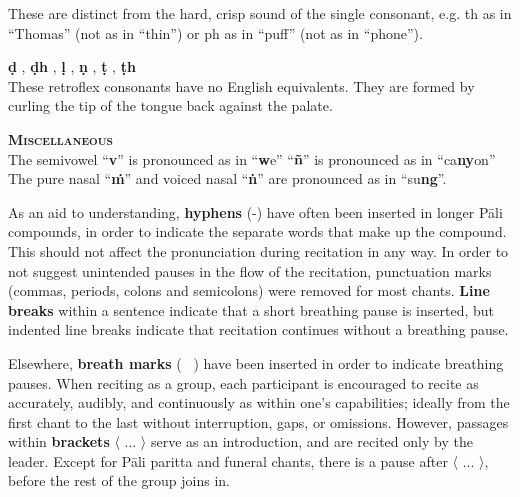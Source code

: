 \begin{justify}
  These are distinct from the hard, crisp sound of the single consonant, e.g. th as in ``Thomas'' (not as in ``thin'') or ph as in ``puff'' (not as in ``phone'').
\end{justify}


\begin{justify}
  \textbf{ḍ} , \textbf{ḍh} , \textbf{ḷ} , \textbf{ṇ} , \textbf{ṭ} , \textbf{ṭh}\\
  These retroflex consonants have no English equivalents. They are formed by curling the tip of the tongue back against the palate.
\end{justify}


\begin{justify}
  \textbf{\textsc{Miscellaneous}}\\
  The semivowel ``\textbf{v}'' is pronounced as in ``\textbf{w}e'' ``\textbf{ñ}'' is pronounced as in ``ca\textbf{ny}on'' The pure nasal ``\textbf{ṁ}'' and voiced nasal ``\textbf{ṅ}'' are pronounced as in ``su\textbf{ng}''.
\end{justify}

\begin{justify}
  As an aid to understanding, \textbf{hyphens} (-) have often been inserted in longer Pāli compounds, in order to indicate the separate words that make up the compound. This should not affect the pronunciation during recitation in any way. In order to not suggest unintended pauses in the flow of the recitation, punctuation marks (commas, periods, colons and semicolons) were removed for most chants. \textbf{Line breaks} within a sentence indicate that a short breathing pause is inserted, but indented line breaks indicate that recitation continues without a breathing pause.
\end{justify}

\begin{justify}
  Elsewhere, \textbf{breath marks} ( \abbrbreathmark\ ) have been inserted in order to indicate breathing pauses. When reciting as a group, each participant is encouraged to recite as accurately, audibly, and continuously as within one's capabilities; ideally from the first chant to the last without interruption, gaps, or omissions. However, passages within \textbf{brackets} 〈 ...\hspace{-0.5mm} 〉 serve as an introduction, and are recited only by the leader. Except for Pāli paritta and funeral chants, there is a pause after 〈 ...\hspace{-0.5mm} 〉, before the rest of the group joins in.
\end{justify}

\clearpage

